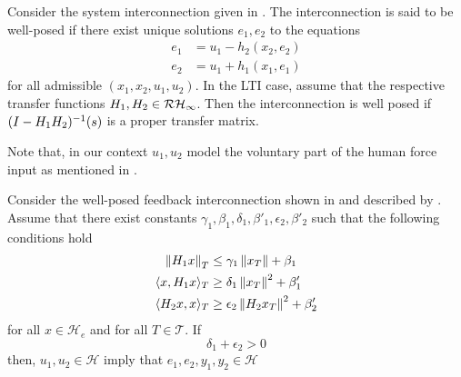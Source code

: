 \begin{define} Consider the system interconnection given in . The interconnection is said to 
be well-posed if there exist unique solutions $e_1,e_2$ to the equations
\begin{align}\label{eq:apdx:passint1}
e_1 &= u_1-h_2(x_2,e_2)\\\label{eq:apdx:passint2}
e_2 &= u_1+h_1(x_1,e_1)
\end{align}
for all admissible $(x_1,x_2,u_1,u_2)$. In the LTI case, assume that the respective transfer functions $H_1,H_2\in\mathcal{RH}_\infty$. Then
the interconnection is well posed if $(I-H_1H_2)^{-1}(s)$ is a proper transfer matrix.
\end{define}

Note that, in our context $u_1,u_2$ model the voluntary part of the human force input as mentioned in . 



\begin{thm}Consider the well-posed feedback interconnection shown in  and 
described by . Assume that there exist constants $\gamma_1,\beta_1,
\delta_1,\beta'_1,\epsilon_2,\beta'_2$ such that the following conditions hold
\begin{align}
\displaystyle \left\| H_1x \right\|_T &\leq \gamma_1\displaystyle \left\| x_T \right\|+\beta_1\\
\langle x,H_1x\rangle_T &\geq \delta_1\displaystyle \left\| x_T \right\|^2+\beta'_1\\
\langle H_2x,x\rangle_T &\geq \epsilon_2\displaystyle \left\| H_2x_T \right\|^2+\beta'_2
\end{align}
for all $x\in\mathcal{H}_e$ and for all $T\in\mathcal{T}$. If 
\begin{equation}
\delta_1+\epsilon_2 >0
\label{eq:apdx:actpas}
\end{equation}
then, $u_1,u_2 \in \mathcal{H}$ imply that $e_1,e_2,y_1,y_2\in\mathcal{H}$ 
\end{thm}

